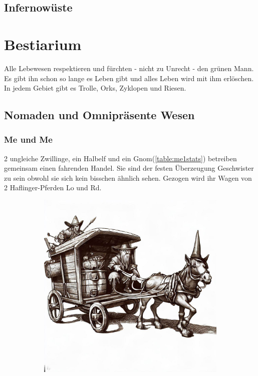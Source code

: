 \documentclass[11pt, twoside]{article}
\begin{document}
\subsection{Infernowüste}
\label{sec:orgc5b2f31}

\newpage

\section{Bestiarium}
\label{sec:org788bfca}
Alle Lebewesen respektieren und fürchten - nicht zu Unrecht - den grünen Mann. Es gibt ihn schon so lange es Leben gibt und alles Leben wird mit ihm erlöschen.
In jedem Gebiet gibt es Trolle, Orks, Zyklopen und Riesen.

\clearpage

\subsection{Nomaden und Omnipräsente Wesen}
\label{sec:org848a873}
\subsubsection{Me und Me\label{meme}}
\label{sec:orgd6f8e00}
2 ungleiche Zwillinge, ein Halbelf und ein Gnom(\ref{table:me1stats}) betreiben gemeinsam einen fahrenden Handel. Sie sind der festen Überzeugung Geschwister zu sein obwohl sie sich kein bisschen ähnlich sehen. Gezogen wird ihr Wagen von 2 Haflinger-Pferden Lo und Rd.
\begin{figure}[H]
\centering
\caption{Die Händler Me und Me}
\label{fig:meme}
  \begin{subfigure}{0.5\textwidth}
    \centering
    \includegraphics[width=0.99\linewidth]{meme.jpeg}
  \end{subfigure}
\end{figure}
\end{document}
